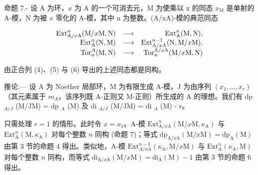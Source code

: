 命题 7.- 设 A 为环，\(x\) 为 A 的一个可消去元，M 为使乘以 x 的同态 \(x_{\mathrm{M}}\) 是单射的 A-模，N 为被 \(x\) 零化的 A-模，其中 n 为整数。(A/xA)-模的典范同态

\[
\begin{array}{r l r} \mathrm{Ext} _ {\mathrm{A} / x \mathrm{A}} ^ {n} (\mathrm{M} / x \mathrm{M}, \mathrm{N}) & \longrightarrow & \mathrm{Ext} _ {\mathrm{A}} ^ {n} (\mathrm{M}, \mathrm{N}), \\ \mathrm{Ext} _ {\mathrm{A}} ^ {n} (\mathrm{N}, \mathrm{M}) & \longrightarrow & \mathrm{Ext} _ {\mathrm{A} / x \mathrm{A}} ^ {n - 1} (\mathrm{N}, \mathrm{M} / x \mathrm{M}), \\ \mathrm{Tor} _ {n} ^ {A} (\mathrm{M}, \mathrm{N}) & \longrightarrow & \mathrm{Tor} _ {n} ^ {\mathrm{A} / x \mathrm{A}} (\mathrm{M} / x \mathrm{M}, \mathrm{N}) \end{array}
\]

由正合列 (4)、(5) 与 (6) 导出的上述同态都是同构。

推论.--- 设 A 为 Noether 局部环，M 为有限生成 A-模，J 为由序列 \((x_{1},\ldots,x_{r})\)（其元素属于 \(m_{A}\)，该序列既 A-正则又 M-正则）所生成的 A 的理想。我们有 dp \(_{A/J}\) (M/JM) = dp \(_{A}\) (M) 及 di \(_{A/J}\) (M/JM) = di \(_{A}\) (M) - r。

只需处理 \(r = 1\) 的情形。此时令 \(x = x_1\)。A-模 \(\mathrm{Ext}_{\mathrm{A} / x\mathrm{A}}^{n}(\mathrm{M} / x\mathrm{M},\kappa_{\mathrm{A}})\) 与 \(\mathrm{Ext}_{\mathrm{A}}^{n}(\mathrm{M},\kappa_{\mathrm{A}})\) 对每个整数 \(n\) 同构 (命题 7)；等式 \(\mathrm{dp}_{\mathrm{A} / x\mathrm{A}}(\mathrm{M} / x\mathrm{M}) = \mathrm{dp}_{\mathrm{A}}(\mathrm{M})\) 由第 3 节的命题 4 得出。类似地，A-模 \(\mathrm{Ext}_{A /x\mathrm{A}}^{n - 1}(\kappa_{\mathrm{A}},\mathrm{M} / x\mathrm{M})\) 与 \(\mathrm{Ext}_{\mathrm{A}}^{n}(\kappa_{\mathrm{A}},\mathrm{M})\) 对每个整数 \(n\) 同构，而等式 \(\mathrm{di}_{\mathrm{A} / x\mathrm{A}}(\mathrm{M} / x\mathrm{M}) = \mathrm{di}_{\mathrm{A}}(\mathrm{M}) - 1\) 由第 3 节的命题 6 得出。

